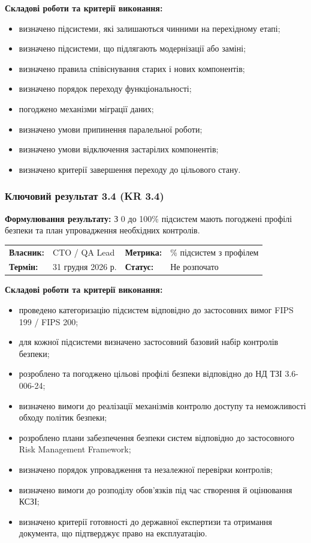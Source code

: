 \documentclass{article}
\begin{document}
\vspace{10pt}
\textbf{Складові роботи та критерії виконання:}
\begin{itemize}
    \item визначено підсистеми, які залишаються чинними на перехідному етапі;
    \item визначено підсистеми, що підлягають модернізації або заміні;
    \item визначено правила співіснування старих і нових компонентів;
    \item визначено порядок переходу функціональності;
    \item погоджено механізми міграції даних;
    \item визначено умови припинення паралельної роботи;
    \item визначено умови відключення застарілих компонентів;
    \item визначено критерії завершення переходу до цільового стану.
\end{itemize}

\subsubsection{Ключовий результат 3.4 (KR 3.4)}

\textbf{Формулювання результату:} З 0 до 100\% підсистем мають погоджені профілі безпеки та план упровадження необхідних контролів.

\noindent\begin{tabular}{@{}p{2.2cm}p{4.5cm}p{2.2cm}p{4.5cm}@{}}
\toprule
\textbf{Власник:} & CTO / QA Lead & \textbf{Метрика:} & \% підсистем з профілем \\
\textbf{Термін:} & 31 грудня 2026 р. & \textbf{Статус:} & Не розпочато \\
\bottomrule
\end{tabular}

\vspace{10pt}
\textbf{Складові роботи та критерії виконання:}
\begin{itemize}
    \item проведено категоризацію підсистем відповідно до застосовних вимог FIPS 199 / FIPS 200;
    \item для кожної підсистеми визначено застосовний базовий набір контролів безпеки;
    \item розроблено та погоджено цільові профілі безпеки відповідно до НД ТЗІ 3.6-006-24;
    \item визначено вимоги до реалізації механізмів контролю доступу та неможливості обходу політик безпеки;
    \item розроблено плани забезпечення безпеки систем відповідно до застосовного Risk Management Framework;
    \item визначено порядок упровадження та незалежної перевірки контролів;
    \item визначено вимоги до розподілу обов’язків під час створення й оцінювання КСЗІ;
    \item визначено критерії готовності до державної експертизи та отримання документа, що підтверджує право на експлуатацію.
\end{itemize}
\end{document}
